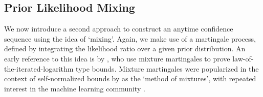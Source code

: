 \subsection{Prior Likelihood Mixing}

We now introduce a second approach to construct an anytime confidence sequence using the idea of `mixing'. Again, we make use of a martingale process, defined by integrating the likelihood ratio over a given prior distribution. An early reference to this idea is by \cite{robbins1970boundary}, who use mixture martingales to prove law-of-the-iterated-logarithm type bounds. Mixture martingales were popularized in the context of self-normalized bounds by \cite{pena2009self} as the `method of mixtures', with repeated interest in the machine learning community \citep[e.g.,][]{abbasi2011improved}.

